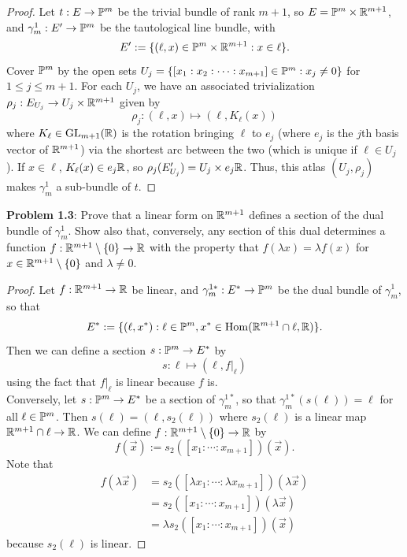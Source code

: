 \documentclass{amsart}
\begin{document}
\begin{proof}
	Let $t:E\to \P^m$ be the trivial bundle of rank $m+1$, so $E=\P^m\times \R^{m+1}$, and $\gamma_m^1:E'\to \P^m$ be the tautological line bundle, with 
	$$
	E' := \{(\ell,x)\in \P^m\times \R^{m+1} : x\in \ell\}.
	$$
	Cover $\P^m$ by the open sets $U_j = \{[x_1:x_2:\cdots:x_{m+1}] \in \P^m : x_j\neq 0\}$ for $1\leq j \leq m+1$. For each $U_j$, we have an associated trivialization $\rho_j:E_{U_j}\to U_j\times\R^{m+1}$ given by
	$$
	\rho_j: (\ell,x)\mapsto (\ell,K_{\ell}(x))
	$$ 
	where $K_{\ell}\in \GL_{m+1}(\R)$ is the rotation bringing $\ell$ to $e_j$ (where $e_j$ is the $j$th basis vector of $\R^{m+1}$) via the shortest arc between the two (which is unique if $\ell \in U_j$). If $x\in \ell$, $K_{\ell}(x)\in e_j\R$, so $\rho_j(E'_{U_j})=U_j \times e_j\R$. Thus, this atlas $(U_j,\rho_j)$ makes $\gamma_m^1$ a sub-bundle of $t$.
\end{proof}
\newpage 

\textbf{Problem 1.3}: Prove that a linear form on $\R^{m+1}$ defines a section of the dual bundle of $\gamma_m^1$. Show also that, conversely, any section of this dual determines a function $f:\R^{m+1}\setminus \{0\} \to \R$ with the property that $f(\lambda x)=\lambda f(x)$ for $x\in \R^{m+1}\setminus \{0\}$ and $\lambda \neq 0$.
\begin{proof}
	Let $f:\R^{m+1}\to \R$ be linear, and $\gamma_m^{1*}:E^*\to \P^m$ be the dual bundle of $\gamma_m^1$, so that 
	$$
	E^* := \{(\ell,x^*) : \ell\in \P^m, x^*\in \Hom(\R^{m+1}\cap \ell, \R)\}.
	$$
	Then we can define a section $s:\P^m\to E^*$ by 
	$$
	s: \ell\mapsto (\ell, f|_{\ell})
	$$
	using the fact that $f|_{\ell}$ is linear because $f$ is.\\
%	
	
	Conversely, let $s:\P^m\to E^*$ be a section of $\gamma_m^{1*}$, so that $\gamma_m^{1*}(s(\ell))=\ell$ for all $\ell \in \P^m$. Then $s(\ell)=(\ell,s_2(\ell))$ where $s_2(\ell)$ is a linear map $\R^{m+1}\cap \ell \to \R$. We can define $f:\R^{m+1}\setminus \{0\}\to \R$ by
	$$
	f(\vec{x}) := s_2([x_1:\cdots:x_{m+1}])(\vec{x}).
	$$
	Note that 
	\begin{align*}
	f(\lambda \vec{x}) &= s_2([\lambda x_1:\cdots: \lambda x_{m+1}])(\lambda \vec{x}) \\
	&= s_2([x_1:\cdots:x_{m+1}])(\lambda \vec{x})\\
	&= \lambda s_2([x_1:\cdots:x_{m+1}])(\vec{x})
	\end{align*}
	because $s_2(\ell)$ is linear.
\end{proof}
\end{document}
